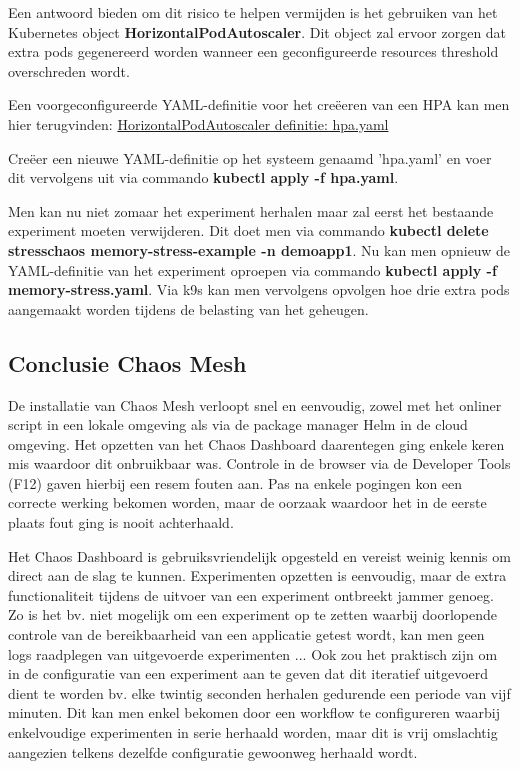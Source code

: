 Een antwoord bieden om dit risico te helpen vermijden is het gebruiken van het Kubernetes object {\bf HorizontalPodAutoscaler}. Dit object zal ervoor zorgen dat extra pods gegenereerd worden wanneer een geconfigureerde resources threshold overschreden wordt.

Een voorgeconfigureerde YAML-definitie voor het creëeren van een HPA kan men hier terugvinden: 
\href{https://github.com/KenBruggeman/BP_21-22/blob/master/bachelorproef/docs/chaosmesh-experimenten/hpa.yaml}{HorizontalPodAutoscaler definitie: hpa.yaml} 

Creëer een nieuwe YAML-definitie op het systeem genaamd 'hpa.yaml' en voer dit vervolgens uit via commando {\bf kubectl apply -f hpa.yaml}. 

Men kan nu niet zomaar het experiment herhalen maar zal eerst het bestaande experiment moeten verwijderen. Dit doet men via commando {\bf kubectl delete stresschaos memory-stress-example -n demoapp1}. Nu kan men opnieuw de YAML-definitie van het experiment oproepen via commando {\bf kubectl apply -f memory-stress.yaml}. Via k9s kan men vervolgens opvolgen hoe drie extra pods aangemaakt worden tijdens de belasting van het geheugen.
 
\subsection{Conclusie Chaos Mesh}

De installatie van Chaos Mesh verloopt snel en eenvoudig, zowel met het onliner script in een lokale omgeving als via de package manager Helm in de cloud omgeving. Het opzetten van het Chaos Dashboard daarentegen ging enkele keren mis waardoor dit onbruikbaar was. Controle in de browser via de Developer Tools (F12) gaven hierbij een resem fouten aan. Pas na enkele pogingen kon een correcte werking bekomen worden, maar de oorzaak waardoor het in de eerste plaats fout ging is nooit achterhaald.

Het Chaos Dashboard is gebruiksvriendelijk opgesteld en vereist weinig kennis om direct aan de slag te kunnen. Experimenten opzetten is eenvoudig, maar de extra functionaliteit tijdens de uitvoer van een experiment ontbreekt jammer genoeg. Zo is het bv. niet mogelijk om een experiment op te zetten waarbij doorlopende controle van de bereikbaarheid van een applicatie getest wordt, kan men geen logs raadplegen van uitgevoerde experimenten ... Ook zou het praktisch zijn om in de configuratie van een experiment aan te geven dat dit iteratief uitgevoerd dient te worden bv. elke twintig seconden herhalen gedurende een periode van vijf minuten. Dit kan men enkel bekomen door een workflow te configureren waarbij enkelvoudige experimenten in serie herhaald worden, maar dit is vrij omslachtig aangezien telkens dezelfde configuratie gewoonweg herhaald wordt.

